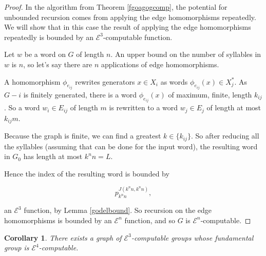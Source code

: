 \documentclass[a4paper]{article}
\newcommand{\grz}[1]{$\mathcal{E}^{#1}$}	%
\theoremstyle{plain}
\newtheorem{corollary}[theorem]{Corollary}
\theoremstyle{definition}
\begin{document}
\begin{proof}

In the algorithm from Theorem \ref{fgoagogcomp}, the potential for unbounded recursion comes from applying the edge homomorphisms repeatedly. We will show that in this case the result of applying the edge homomorphisms repeatedly is bounded by an \grz{3}-computable function.

Let $w$ be a word on $G$ of length $n$. An upper bound on the number of syllables in $w$ is $n$, so let's say there are $n$ applications of edge homomorphisms.

A homomorphism $\phi_{e_{ij}}$ rewrites generators $x \in X_i$ as words $\phi_{e_{ij}}(x) \in X_j^{\ast}$. As $G-i$ is finitely generated, there is a word $\phi_{e_{ij}}(x)$ of maximum, finite, length $k_{ij}$. So a word $w_i \in E_{ij}$ of length $m$ is rewritten to a word $w_j \in E_j$ of length at most $k_{ij}m$.

Because the graph is finite, we can find a greatest $k \in \{k_{ij}\}$. So after reducing all the syllables (assuming that can be done for the input word), the resulting word in $G_0$ has length at most $k^n n = L$.

Hence the index of the resulting word is bounded by

\[ p_{k^nn}^{J(k^nn,k^nn)},\]

an \grz{3} function, by Lemma \ref{godelbound}. So recursion on the edge homomorphisms is bounded by an \grz{n} function, and so $G$ is \grz{n}-computable.

\end{proof}

\begin{corollary}
There exists a graph of \grz{3}-computable groups whose fundamental group is \grz{4}-computable.
\end{corollary}
\end{document}
